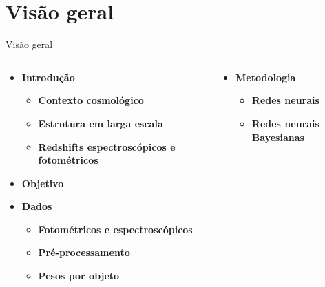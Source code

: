 
\section{Visão geral}
\begin{frame}[c]{Visão geral}
    \begin{columns}[c]
        \vspace*{-0.5cm}
        \begin{column}{0.48\linewidth}
            \begin{splusbox}{}
                \begin{itemize}
                    \item \textbf{Introdução}
                    \begin{itemize}
                        \item \textbf{Contexto cosmológico}
                        \item \textbf{Estrutura em larga escala}
                        \item \textbf{Redshifts espectroscópicos e fotométricos}
                    \end{itemize}
                    \item \textbf{Objetivo}
                    \item \textbf{Dados}
                    \begin{itemize}
                        \item \textbf{Fotométricos e espectroscópicos}
                        \item \textbf{Pré-processamento}
                        \item \textbf{Pesos por objeto}
                    \end{itemize}
                \end{itemize}
            \end{splusbox}
        \end{column}
        \begin{column}{0.48\linewidth}
            \begin{splusbox}{}
                \begin{itemize}
                    \item \textbf{Metodologia}
                    \begin{itemize}
                        \item \textbf{Redes neurais}
                        \item \textbf{Redes neurais Bayesianas}

\end{itemize}
\end{itemize}
\end{splusbox}
\end{column}
\end{columns}
\end{frame}
